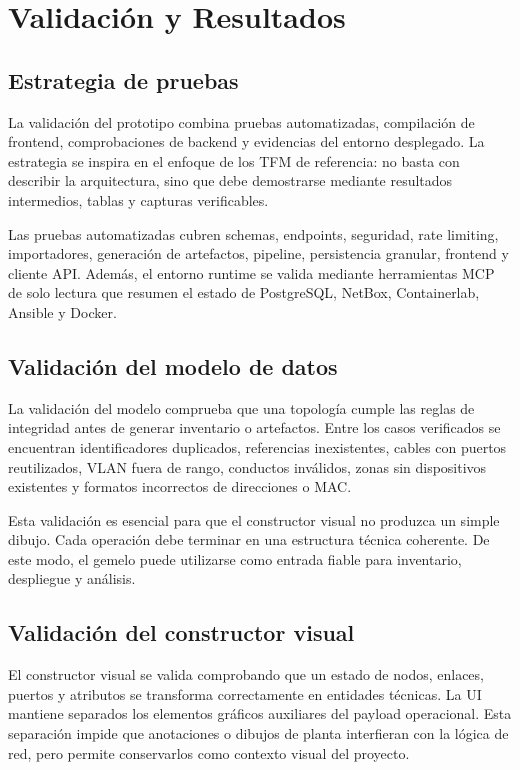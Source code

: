 \chapter{Validación y Resultados} \label{ch:validacion-resultados}

\section{Estrategia de pruebas} \label{sec:estrategia-pruebas}

La validación del prototipo combina pruebas automatizadas, compilación de frontend, comprobaciones de backend y evidencias del entorno desplegado. La estrategia se inspira en el enfoque de los TFM de referencia: no basta con describir la arquitectura, sino que debe demostrarse mediante resultados intermedios, tablas y capturas verificables.

Las pruebas automatizadas cubren schemas, endpoints, seguridad, rate limiting, importadores, generación de artefactos, pipeline, persistencia granular, frontend y cliente API. Además, el entorno runtime se valida mediante herramientas MCP de solo lectura que resumen el estado de PostgreSQL, NetBox, Containerlab, Ansible y Docker.

\section{Validación del modelo de datos} \label{sec:validacion-modelo}

La validación del modelo comprueba que una topología cumple las reglas de integridad antes de generar inventario o artefactos. Entre los casos verificados se encuentran identificadores duplicados, referencias inexistentes, cables con puertos reutilizados, VLAN fuera de rango, conductos inválidos, zonas sin dispositivos existentes y formatos incorrectos de direcciones o MAC.

Esta validación es esencial para que el constructor visual no produzca un simple dibujo. Cada operación debe terminar en una estructura técnica coherente. De este modo, el gemelo puede utilizarse como entrada fiable para inventario, despliegue y análisis.

\section{Validación del constructor visual} \label{sec:validacion-constructor}

El constructor visual se valida comprobando que un estado de nodos, enlaces, puertos y atributos se transforma correctamente en entidades técnicas. La UI mantiene separados los elementos gráficos auxiliares del payload operacional. Esta separación impide que anotaciones o dibujos de planta interfieran con la lógica de red, pero permite conservarlos como contexto visual del proyecto.


